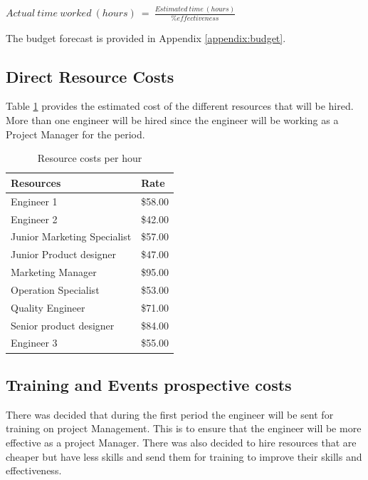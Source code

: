 \begin{center}
$ Actual\ time\ worked\ (hours)\ =\ \frac{Estimated\ time\ (hours)}{\% effectiveness} $
\end{center}

The budget forecast is provided in Appendix \ref{appendix:budget}.

\subsection{Direct Resource Costs}

Table \ref{tab:resourcecosts} provides the estimated cost of the different resources that will be hired. More than one engineer will be hired since the engineer will be working as a Project Manager for the period.

\begin{table}[]
\centering
\caption{Resource costs per hour}
\label{tab:resourcecosts}
\begin{tabular}{ll}
\textbf{Resources}          & \textbf{Rate} \\\hline
Engineer 1                  & \$58.00       \\
Engineer 2                  & \$42.00       \\
Junior Marketing Specialist & \$57.00       \\
Junior Product designer     & \$47.00       \\
Marketing Manager           & \$95.00       \\
Operation Specialist        & \$53.00       \\
Quality Engineer            & \$71.00       \\
Senior product designer     & \$84.00       \\
Engineer 3                  & \$55.00      
\end{tabular}
\end{table}

\subsection{Training and Events prospective costs}

There was decided that during the first period the engineer will be sent for training on project Management. This is to ensure that the engineer will be more effective as a project Manager. There was also decided to hire resources that are cheaper but have less skills and send them for training to improve their skills and effectiveness.\\

